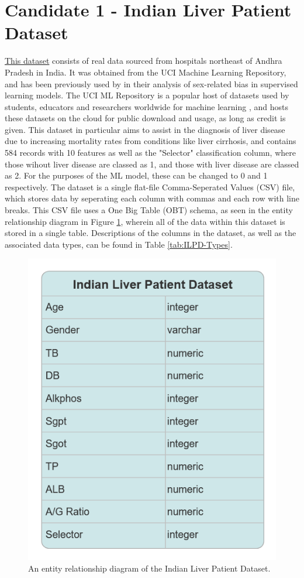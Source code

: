 \documentclass[12pt]{report}
\begin{document}
\section{Candidate 1 - Indian Liver Patient Dataset}
\href{https://archive.ics.uci.edu/dataset/225}{This dataset} \autocite{bendi_ramana_ilpd_2022} consists of real data sourced from hospitals northeast of Andhra Pradesh in India. It was obtained from the
UCI Machine Learning Repository, and has been previously used by \textcite{straw_investigating_2022} in their analysis of sex-related bias in supervised learning models. The UCI ML Repository is a popular host of datasets used by students, 
educators and researchers worldwide for machine learning \autocite{uci_machine_learning_repository_about_nodate}, and hosts these datasets 
on the cloud for public download and usage, as long as credit is given. This dataset in particular aims to assist in the diagnosis of liver
disease due to increasing mortality rates from conditions like liver cirrhosis, and contains 584 records with 10 features
as well as the "Selector" classification column, where those wihout liver disease are classed as 1, and those with liver disease 
are classed as 2. For the purposes of the ML model, these can be changed to 0 and 1 respectively. 
The dataset is a single flat-file Comma-Seperated Values (CSV) file, which stores data by seperating each column with commas
and each row with line breaks. This CSV file uses a One Big Table (OBT) schema, as seen in the entity relationship diagram 
in Figure \ref{fig:ILPD-ERD}, wherein all of the data within this dataset is stored in a single table. %
Descriptions of the columns in the dataset, as well as the associated data types, can be found in Table \ref{tab:ILPD-Types}.

\begin{figure}[H]
    \centering
    \includegraphics[width=.75\linewidth]{ILPD-ERD.png}
    \caption{An entity relationship diagram of the Indian Liver Patient Dataset.}
    \label{fig:ILPD-ERD}
\end{figure}
\end{document}

